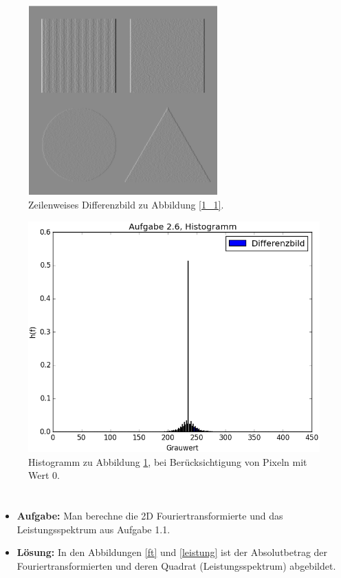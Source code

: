 \documentclass[12pt, a4paper, twoside]{report}
\begin{document}
\begin{figure}[h]
\centering
\includegraphics[width=0.65\textwidth]{../bilder/diff_img.png}
\caption{Zeilenweises Differenzbild zu Abbildung \ref{1_1}.}
\label{diff_img}
\end{figure}

\begin{figure}[h]
\centering
\includegraphics[width=\textwidth]{../bilder/diff_hist.png}
\caption{Histogramm zu Abbildung \ref{diff_img}, bei Berücksichtigung von Pixeln mit Wert 0.}
\label{diff_hist}
\end{figure}

\section{}
\begin{itemize}
\item \textbf{Aufgabe:} Man berechne die 2D Fouriertransformierte und das Leistungsspektrum aus Aufgabe 1.1.
\item \textbf{Lösung:} In den Abbildungen \ref{ft} und \ref{leistung} ist der Absolutbetrag der Fouriertransformierten und deren Quadrat (Leistungsspektrum) abgebildet.
\end{itemize}
\end{document}
